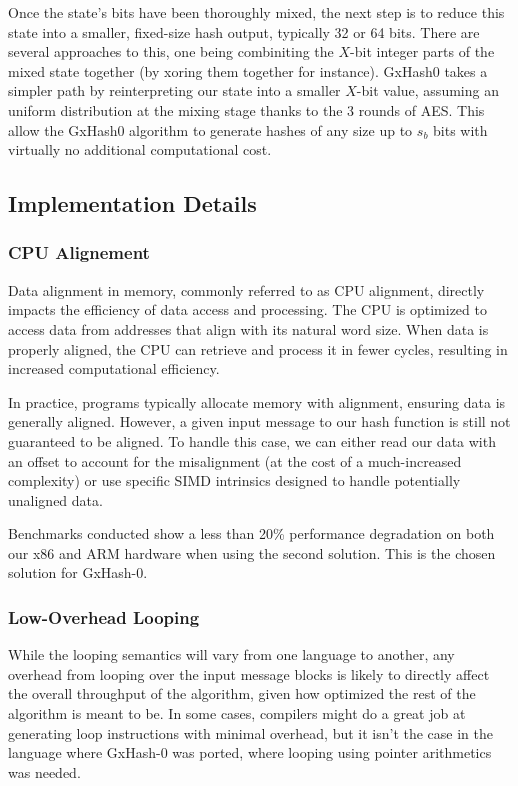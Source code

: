 \documentclass[10pt]{article}
\begin{document}
Once the state's bits have been thoroughly mixed, the next step is to reduce this state into a smaller, fixed-size hash output, typically 32 or 64 bits. There are several approaches to this, one being combiniting the \( X \)-bit integer parts of the mixed state together (by xoring them together for instance). GxHash0 takes a simpler path by reinterpreting our state into a smaller \( X \)-bit value, assuming an uniform distribution at the mixing stage thanks to the 3 rounds of AES. This allow the GxHash0 algorithm to generate hashes of any size up to \( s_b \) bits with virtually no additional computational cost.

\subsection{Implementation Details}

\subsubsection{CPU Alignement}

Data alignment in memory, commonly referred to as CPU alignment, directly impacts the efficiency of data access and processing. The CPU is optimized to access data from addresses that align with its natural word size. When data is properly aligned, the CPU can retrieve and process it in fewer cycles, resulting in increased computational efficiency.

In practice, programs typically allocate memory with alignment, ensuring data is generally aligned. However, a given input message to our hash function is still not guaranteed to be aligned. To handle this case, we can either read our data with an offset to account for the misalignment (at the cost of a much-increased complexity) or use specific SIMD intrinsics designed to handle potentially unaligned data. 

Benchmarks conducted show a less than 20\% performance degradation on both our x86 and ARM hardware when using the second solution. This is the chosen solution for GxHash-0.

\subsubsection{Low-Overhead Looping}

While the looping semantics will vary from one language to another, any overhead from looping over the input message blocks is likely to directly affect the overall throughput of the algorithm, given how optimized the rest of the algorithm is meant to be. In some cases, compilers might do a great job at generating loop instructions with minimal overhead, but it isn't the case in the language where GxHash-0 was ported, where looping using pointer arithmetics was needed.
\end{document}
